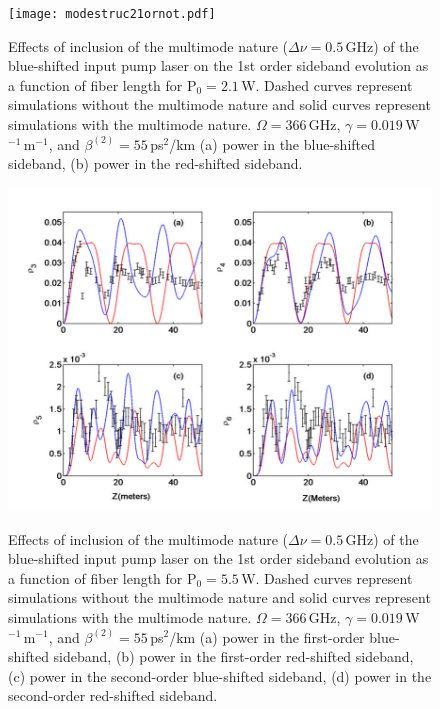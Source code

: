 \begin{figure}
\begin{center}
\texttt{[image: modestruc21ornot.pdf]}
\end{center}
\renewcommand{\baselinestretch}{1}
\small\normalsize
\begin{quote}
\caption[Short caption for Figure A.2.]
{Effects of inclusion of the multimode nature ($\Delta\nu = 0.5$\,GHz) of the blue-shifted input pump laser on the 1st order sideband evolution as a function of fiber length for P$_0 = 2.1$\,W. Dashed curves represent simulations without the multimode nature and solid curves represent simulations with the multimode nature. $\Omega = 366$\,GHz, $\gamma = 0.019$\,W$^{-1}$\,m$^{-1}$, and $\beta^{(2)} = 55$\,ps$^2$/km (a) power in the blue-shifted sideband, (b) power in the red-shifted sideband.}
\label{figA.2}
\end{quote}
\end{figure}
\renewcommand{\baselinestretch}{2}
\small\normalsize

\begin{figure}
\begin{center}
\includegraphics[width=5in]{modestruc55ornot.pdf}
\end{center}
\renewcommand{\baselinestretch}{1}
\small\normalsize
\begin{quote}
\caption[Effects of inclusion of the multimode nature]
{Effects of inclusion of the multimode nature ($\Delta\nu = 0.5$\,GHz) of the blue-shifted input pump laser on the 1st order sideband evolution as a function of fiber length for P$_0 = 5.5$\,W. Dashed curves represent simulations without the multimode nature and solid curves represent simulations with the multimode nature. $\Omega = 366$\,GHz, $\gamma = 0.019$\,W$^{-1}$\,m$^{-1}$, and $\beta^{(2)} = 55$\,ps$^2$/km (a) power in the first-order blue-shifted sideband, (b) power in the first-order red-shifted sideband, (c) power in the second-order blue-shifted sideband, (d) power in the second-order red-shifted sideband.}
\label{figA.3}
\end{quote}
\end{figure}
\renewcommand{\baselinestretch}{2}
\small\normalsize

